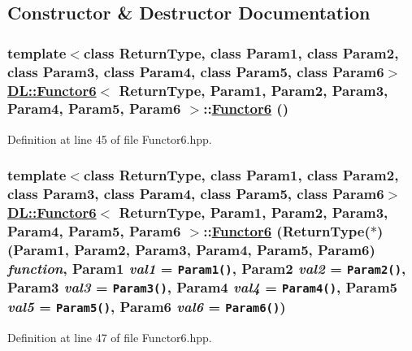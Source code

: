 \subsection{Constructor \& Destructor Documentation}
\hypertarget{classDL_1_1Functor6_d0}{
\subsubsection[Functor6]{\setlength{\rightskip}{0pt plus 5cm}template$<$class Return\-Type, class Param1, class Param2, class Param3, class Param4, class Param5, class Param6$>$ \hyperlink{classDL_1_1Functor6}{DL::Functor6}$<$ Return\-Type, Param1, Param2, Param3, Param4, Param5, Param6 $>$::\hyperlink{classDL_1_1Functor6}{Functor6} ()}}
\label{classDL_1_1Functor6_d0}




Definition at line 45 of file Functor6.hpp.\hypertarget{classDL_1_1Functor6_a0}{
\subsubsection[Functor6]{\setlength{\rightskip}{0pt plus 5cm}template$<$class Return\-Type, class Param1, class Param2, class Param3, class Param4, class Param5, class Param6$>$ \hyperlink{classDL_1_1Functor6}{DL::Functor6}$<$ Return\-Type, Param1, Param2, Param3, Param4, Param5, Param6 $>$::\hyperlink{classDL_1_1Functor6}{Functor6} (Return\-Type($\ast$)(Param1, Param2, Param3, Param4, Param5, Param6) {\em function}, Param1 {\em val1} = {\tt Param1()}, Param2 {\em val2} = {\tt Param2()}, Param3 {\em val3} = {\tt Param3()}, Param4 {\em val4} = {\tt Param4()}, Param5 {\em val5} = {\tt Param5()}, Param6 {\em val6} = {\tt Param6()})}}
\label{classDL_1_1Functor6_a0}




Definition at line 47 of file Functor6.hpp.

